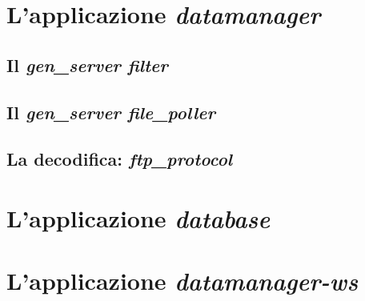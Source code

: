 \section{L'applicazione \emph{datamanager}}
\subsection{Il \emph{gen\_server filter}}
\subsection{Il \emph{gen\_server file\_poller}}
\subsection{La decodifica: \emph{ftp\_protocol}}
\section{L'applicazione \emph{database}}
\section{L'applicazione \emph{datamanager-ws}}
